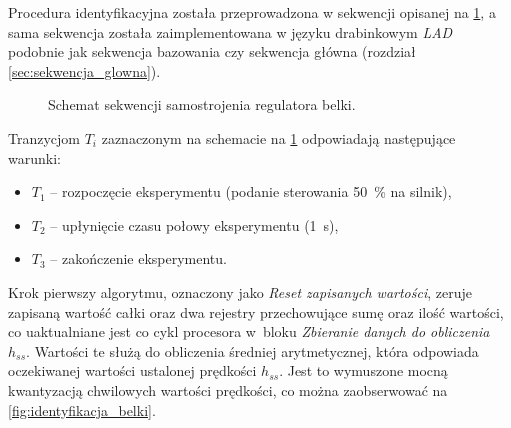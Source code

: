 Procedura identyfikacyjna została przeprowadzona w sekwencji opisanej na \cref{fig:schemat_samostrojenia_belka}, a sama sekwencja została zaimplementowana w języku drabinkowym \textit{LAD} podobnie jak sekwencja bazowania czy sekwencja główna (rozdział \ref{sec:sekwencja_glowna}).

\begin{figure}[ht]
    \centering
    
    
    \caption{Schemat sekwencji samostrojenia regulatora belki.}
    \label{fig:schemat_samostrojenia_belka}
\end{figure}

Tranzycjom $T_i$ zaznaczonym na schemacie na \cref{fig:schemat_samostrojenia_belka} odpowiadają następujące warunki:
\begin{itemize}
    \item $T_1$ -- rozpoczęcie eksperymentu (podanie sterowania \SI{50}{\percent} na silnik),
    \item $T_2$ -- upłynięcie czasu połowy eksperymentu (\SI{1}{\second}),
    \item $T_3$ -- zakończenie eksperymentu.
\end{itemize}

Krok pierwszy algorytmu, oznaczony jako \textit{Reset zapisanych wartości}, zeruje zapisaną wartość całki oraz dwa rejestry przechowujące sumę oraz ilość wartości, co uaktualniane jest co cykl procesora w~bloku \textit{Zbieranie danych do obliczenia $h_{ss}$}. Wartości te służą do obliczenia średniej arytmetycznej, która odpowiada oczekiwanej wartości ustalonej prędkości $h_{ss}$. Jest to wymuszone mocną kwantyzacją chwilowych wartości prędkości, co można zaobserwować na \cref{fig:identyfikacja_belki}.

